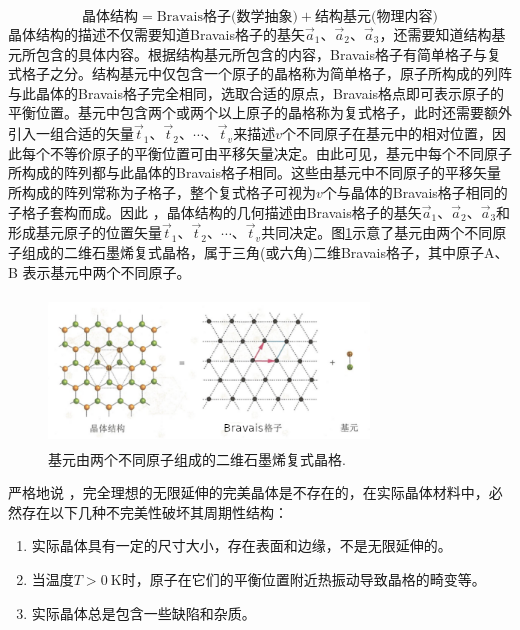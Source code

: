 \begin{displaymath}
	\mbox{晶体结构} = \mbox{Bravais格子(数学抽象)}+ \mbox{结构基元(物理内容)}
\end{displaymath} 
晶体结构的描述不仅需要知道Bravais格子的基矢$\vec a_1$、$\vec a_2$、$\vec a_3$，还需要知道结构基元所包含的具体内容。根据结构基元所包含的内容，Bravais格子有简单格子与复式格子之分。结构基元中仅包含一个原子的晶格称为简单格子，原子所构成的列阵与此晶体的Bravais格子完全相同，选取合适的原点，Bravais格点即可表示原子的平衡位置。基元中包含两个或两个以上原子的晶格称为复式格子，此时还需要额外引入一组合适的矢量$\vec t_1$、$\vec t_2$、$\cdots$、$\vec t_v$来描述$v$个不同原子在基元中的相对位置，因此每个不等价原子的平衡位置可由平移矢量决定。由此可见，基元中每个不同原子所构成的阵列都与此晶体的Bravais格子相同。这些由基元中不同原子的平移矢量所构成的阵列常称为子格子，整个复式格子可视为$v$个与晶体的Bravais格子相同的子格子套构而成。因此 ，晶体结构的几何描述由Bravais格子的基矢$\vec a_1$、$\vec a_2$、$\vec a_3$和形成基元原子的位置矢量$\vec t_1$、$\vec t_2$、$\cdots$、$\vec t_v$共同决定。图\ref{Fig:Graphe_Bravais-Lattice}示意了基元由两个不同原子组成的二维石墨烯复式晶格，属于三角(或六角)二维Bravais格子，其中原子A、B 表示基元中两个不同原子。
\begin{figure}[h!]
\centering
\vspace*{-0.05in}
\includegraphics[height=1.55in,width=3.35in,viewport=0 0 80 40,clip]{Figures/Graphe_Bravais-Lattice.png}
\caption{\small \textrm{基元由两个不同原子组成的二维石墨烯复式晶格.}}%
\label{Fig:Graphe_Bravais-Lattice}
\end{figure}

严格地说 ，完全理想的无限延伸的完美晶体是不存在的，在实际晶体材料中，必然存在以下几种不完美性破坏其周期性结构：
\begin{enumerate}
	\item 实际晶体具有一定的尺寸大小，存在表面和边缘，不是无限延伸的。
	\item 当温度$T>0~\mathrm{K}$时，原子在它们的平衡位置附近热振动导致晶格的畸变等。
	\item 实际晶体总是包含一些缺陷和杂质。
\end{enumerate}

